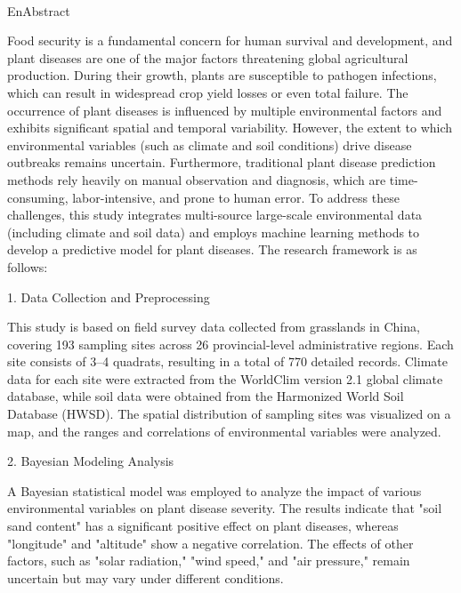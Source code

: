 \documentclass[AutoFakeBold]{LZUThesis-PgD&PhD}
\begin{document}
	\\EnAbstract{
		Food security is a fundamental concern for human survival and development, and plant diseases are one of the major factors threatening global agricultural production. During their growth, plants are susceptible to pathogen infections, which can result in widespread crop yield losses or even total failure. The occurrence of plant diseases is influenced by multiple environmental factors and exhibits significant spatial and temporal variability. However, the extent to which environmental variables (such as climate and soil conditions) drive disease outbreaks remains uncertain. Furthermore, traditional plant disease prediction methods rely heavily on manual observation and diagnosis, which are time-consuming, labor-intensive, and prone to human error. To address these challenges, this study integrates multi-source large-scale environmental data (including climate and soil data) and employs machine learning methods to develop a predictive model for plant diseases. The research framework is as follows:
		
		\par 1. Data Collection and Preprocessing
		\par This study is based on field survey data collected from grasslands in China, covering 193 sampling sites across 26 provincial-level administrative regions. Each site consists of 3–4 quadrats, resulting in a total of 770 detailed records. Climate data for each site were extracted from the WorldClim version 2.1 global climate database, while soil data were obtained from the Harmonized World Soil Database (HWSD). The spatial distribution of sampling sites was visualized on a map, and the ranges and correlations of environmental variables were analyzed.
		
		\par 2. Bayesian Modeling Analysis
		\par A Bayesian statistical model was employed to analyze the impact of various environmental variables on plant disease severity. The results indicate that "soil sand content" has a significant positive effect on plant diseases, whereas "longitude" and "altitude" show a negative correlation. The effects of other factors, such as "solar radiation," "wind speed," and "air pressure," remain uncertain but may vary under different conditions.
		
}
\end{document}
